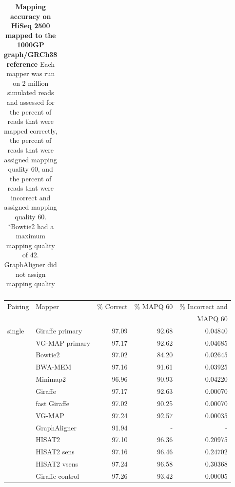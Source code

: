 \documentclass[11pt]{ucscthesis}
\begin{document}
\begin{table}[H]
\begin{tabular}{|l|l|r|r|r|}
        \hline
        
    \end{tabular}
    \caption[Mapping accuracy on HiSeq 2500 reads mapped to the 1000GP graph/GRCh38 reference]{\textbf{Mapping accuracy on HiSeq 2500 mapped to the 1000GP graph/GRCh38 reference} Each mapper was run on 2 million simulated reads and assessed for the percent of reads that were mapped correctly, the percent of reads that were assigned mapping quality 60, and the percent of reads that were incorrect and assigned mapping quality 60. *Bowtie2 had a maximum mapping quality of 42. GraphAligner did not assign mapping quality}
    \label{tab:mapping_accuracy_1kg_hiseq2500}
\end{table}

\begin{table}[H]
    \centering
    \begin{tabular}{|l|l|r|r|r|}
    \hline
        Pairing & Mapper & \% Correct & \% MAPQ 60 & \% Incorrect and\\
               &         &            &            & MAPQ 60          \\
        \hline
        single  & Giraffe primary	& 97.09     & 92.68     & 0.04840 \\
                & VG-MAP primary   	& 97.17     & 92.62     & 0.04685 \\
                & Bowtie2	        & 97.02     & 84.20     & 0.02645 \\
                & BWA-MEM	        & 97.16     & 91.61     & 0.03925 \\
                & Minimap2	        & 96.96     & 90.93     & 0.04220 \\
                & Giraffe	        & 97.17     & 92.63     & 0.00070 \\
                & fast Giraffe	    & 97.02     & 90.25     & 0.00070 \\
                & VG-MAP	        & 97.24     & 92.57     & 0.00035 \\
                & GraphAligner 	    & 91.94     & -      & - \\
                & HISAT2	        & 97.10     & 96.36     & 0.20975 \\
                & HISAT2 sens   	& 97.16     & 96.46     & 0.24702 \\
                & HISAT2 vsens	    & 97.24     & 96.58     & 0.30368 \\
                & Giraffe control	& 97.26     & 93.42     & 0.00005 \\


\end{tabular}
\end{table}
\end{document}

